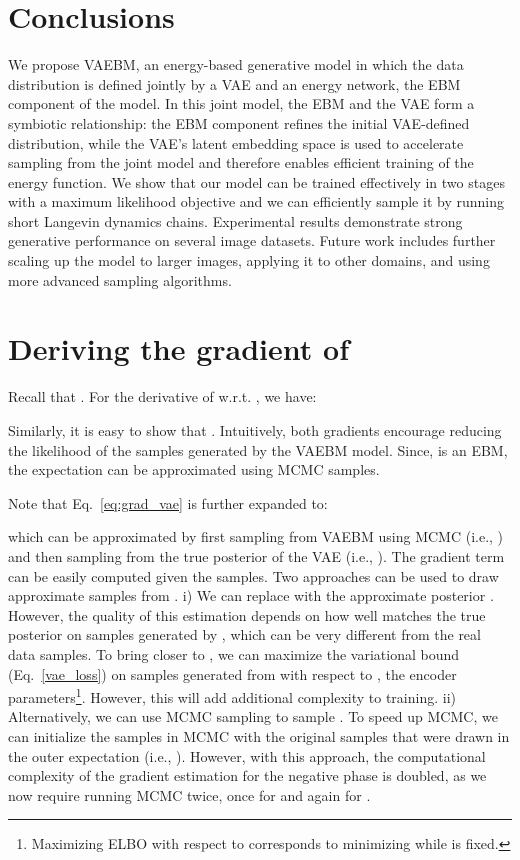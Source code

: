 \documentclass{article} \usepackage{iclr2021_conference,times}
\begin{document}
 \section{Conclusions}
We propose VAEBM, an energy-based generative model in which the data distribution is defined jointly by a VAE and an energy network, the EBM component of the model.
In this joint model, the EBM and the VAE form a symbiotic relationship: the EBM component refines the initial VAE-defined distribution, while the VAE's latent embedding space is used to accelerate sampling from the joint model and therefore enables efficient training of the energy function.
We show that our model can be trained effectively in two stages with a maximum likelihood objective and we can efficiently sample it by running short Langevin dynamics chains. Experimental results demonstrate strong generative performance on several image datasets. Future work includes further scaling up the model to larger images, applying it to other domains, and using more advanced sampling algorithms. 

\newpage


\newpage
\appendix

\section{Deriving the gradient of } \label{log Z gradient}
Recall that . For the derivative of  w.r.t. , we have:

Similarly, it is easy to show that . Intuitively, both gradients encourage reducing the likelihood of the samples generated by the VAEBM model. Since,  is an EBM, the expectation can be approximated using MCMC samples.

Note that Eq.~\ref{eq:grad_vae} is further expanded to:

which can be approximated by first sampling from VAEBM using MCMC (i.e., ) and then sampling from the true posterior of the VAE (i.e., ). The gradient term can be easily computed given the samples.  Two approaches can be used to draw approximate samples from . i) We can replace  with the approximate posterior . However, the quality of this estimation depends on how well  matches the true posterior on samples generated by , which can be very different from the real data samples. To bring  closer to , we can maximize the variational bound (Eq.~\ref{vae_loss}) on samples generated from  with respect to , the encoder parameters\footnote{Maximizing ELBO with respect to  corresponds to minimizing  while  is fixed.}. However, this will add additional complexity to training. ii) Alternatively, we can use MCMC sampling to sample . To speed up MCMC, we can initialize the  samples in MCMC with the original  samples that were drawn in the outer expectation (i.e., ). However, with this approach, the computational complexity of the gradient estimation for the negative phase is doubled, as we now require running MCMC twice, once for  and again for .
\end{document}
